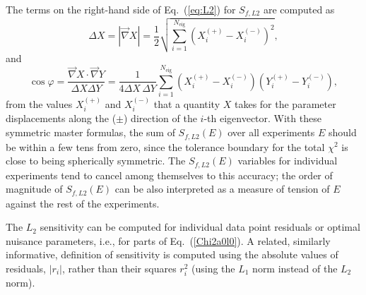 The terms on the right-hand side of Eq.~(\ref{eq:L2}) for $S_{f,L2}$
are computed as
\begin{equation}
\Delta X=\left\vert \vec{\nabla}X\right\vert
=\frac{1}{2}\sqrt{\sum_{i=1}^{N_{\textrm{eig}}}\left(X_{i}^{(+)}-X_{i}^{(-)}\right)^{2}},\label{masterDX}
\end{equation}
and
\begin{equation}
\cos\varphi=\frac{\vec{\nabla}X\cdot\vec{\nabla}Y}{\Delta X\Delta
  Y}=\frac{1}{4\Delta X\,\Delta
  Y}\sum_{i=1}^{N_{\textrm{eig}}}\left(X_{i}^{(+)}-X_{i}^{(-)}\right)\left(Y_{i}^{(+)}-Y_{i}^{(-)}\right),\label{cosphi}
\end{equation}
from the values $X_{i}^{(+)}$ and $X_{i}^{(-)}$ that a quantity
$X$ takes for the parameter displacements
along the ($\pm$) direction of the $i$-th
eigenvector. With these symmetric master formulas, the sum of
$S_{f,L2}(E)$ over all experiments $E$ should be within a
few tens from zero, since the tolerance boundary for the total $\chi^2$ is close to being spherically
symmetric. The $S_{f,L2}(E)$ variables for individual experiments tend to
cancel among themselves to this accuracy; the order of magnitude 
of $S_{f,L2}(E)$ can be also interpreted as a measure  of tension of
$E$ against the rest of the experiments. 

The $L_2$ sensitivity can be computed for individual data point
residuals or optimal nuisance parameters, {i.e.}, for parts of
Eq.~(\ref{Chi2a0l0}). A related, similarly informative,
definition of sensitivity \cite{Wang:2018heo} is computed using the absolute values
of residuals, $|r_i|$, rather than their squares $r_i^2$ (using the
$L_1$ norm instead of the $L_2$ norm). 

